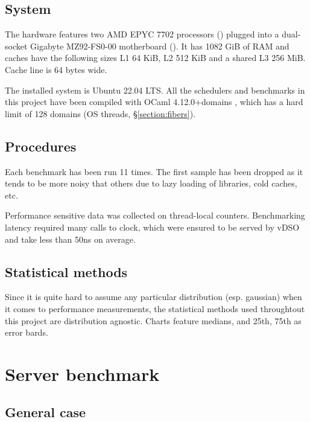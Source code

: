 \documentclass[12pt,a4paper,twoside]{report}
\begin{document}
\subsection{System}
\label{section:methods_system}
The hardware features two AMD EPYC 7702 processors (\cite{2ndGenAM8:online}) plugged into a dual-socket Gigabyte MZ92-FS0-00 motherboard (\cite{MD90FS0r76:online}). It has 1082 GiB of RAM and caches have the following sizes L1 64 KiB, L2 512 KiB and a shared L3 256 MiB. Cache line is 64 bytes wide. 

The installed system is Ubuntu 22.04 LTS. All the schedulers and benchmarks in this project have been compiled with OCaml 4.12.0+domains \cite{ocamlmul16:online}, which has a hard limit of 128 domains (OS threads, \S\ref{section:fibers}). 

\subsection{Procedures}
Each benchmark has been run 11 times. The first sample has been dropped as it tends to be more noisy that others due to lazy loading of libraries, cold caches, etc. 

Performance sensitive data was collected on thread-local counters. Benchmarking latency required many calls to clock, which were ensured to be served by vDSO \cite{vdso7Lin5:online} and take less than 50ns on average. 

\subsection{Statistical methods}
Since it is quite hard to assume any particular distribution (esp. gaussian) when it comes to performance measurements, the statistical methods used throughtout this project are distribution agnostic. Charts feature medians, and 25th, 75th as error bards.






\section{Server benchmark} 
\label{section:server_benchmark}

\subsection{General case}
\label{section:benchmark-general-case}
\end{document}
